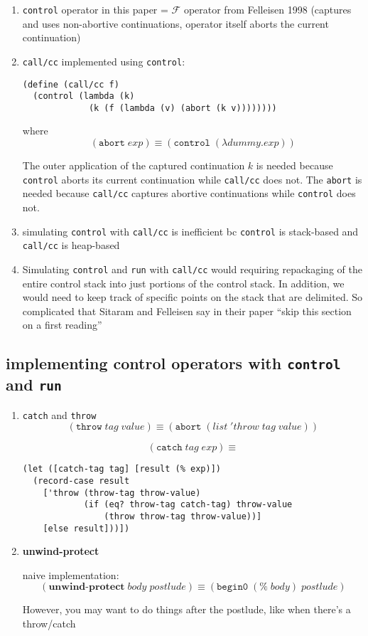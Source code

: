 \documentclass[letterpaper]{llncs}
\newcommand{\F}{ \ensuremath{ \mathcal{F} } }
\newcommand{\app}[2]{ \ensuremath{ #1 \; #2 } }
\newcommand{\appp}[2]{ \ensuremath{ (\app{#1}{#2}) } }
\newcommand{\lam}[2]{ \ensuremath{ \lambda #1.#2 } }
\newcommand{\lamp}[2]{ \ensuremath{ (\lam{#1}{#2}) } }
\newcommand{\createop}[1]{\texttt{#1}\xspace}
\newcommand{\createboldop}[1]{\textbf{#1}\xspace}
\newcommand{\callcc}{\createop{call/cc}}
\newcommand{\ctrl}{\createop{control}}
\newcommand{\abort}{\createop{abort}}
\newcommand{\run}{\createop{run}}
\newcommand{\throw}{\createop{throw}}
\newcommand{\catch}{\createop{catch}}
\newcommand{\beginzero}{\createop{begin0}}
\newcommand{\unwindprotect}{\createboldop{unwind-protect}}
\begin{document}
\begin{enumerate}
	\item \ctrl operator in this paper = $\F$ operator from Felleisen 1998 (captures and uses non-abortive continuations, operator itself aborts the current continuation)
	\item \callcc implemented using \ctrl:
\begin{verbatim}
(define (call/cc f)
  (control (lambda (k)
             (k (f (lambda (v) (abort (k v))))))))
\end{verbatim}

where $$\appp{ \abort }{ exp } \equiv \appp{ \ctrl }{ \lamp{dummy}{exp} }$$

The outer application of the captured continuation $k$ is needed because \ctrl aborts its current continuation while \callcc does not. The \abort is needed because \callcc captures abortive continuations while \ctrl does not.

	\item simulating \ctrl with \callcc is inefficient bc \ctrl is stack-based and \callcc is heap-based
	\item Simulating \ctrl and \run with \callcc would requiring repackaging of the entire control stack into just portions of the control stack. In addition, we would need to keep track of specific points on the stack that are delimited. So complicated that Sitaram and Felleisen say in their paper ``skip this section on a first reading''
\end{enumerate}

\subsection*{implementing control operators with \ctrl and \run}
\begin{enumerate}
	\item \catch and \throw
	$$\appp{ \throw }{ \app{ tag }{ value } } 
	      \equiv
	  \appp{ \abort }{ \appp{list}{ \app{'throw}{ \app{tag}{value} } } }$$
	  
	$$\appp{ \catch }{ \app{tag}{exp} }
	      \equiv$$	
	      
\begin{verbatim}
(let ([catch-tag tag] [result (% exp)])
  (record-case result
    ['throw (throw-tag throw-value)
            (if (eq? throw-tag catch-tag) throw-value
                (throw throw-tag throw-value))]
    [else result]))])
\end{verbatim}



	\item \unwindprotect
	
	naive implementation:
	$$\appp{ \unwindprotect }{ \app{body}{postlude} } 
	      \equiv
	  \appp{ \beginzero }{ \app{ \appp{\%}{body} }{ postlude } }$$
	  
	However, you may want to do things after the postlude, like when there's a throw/catch
\end{enumerate}
\end{document}
